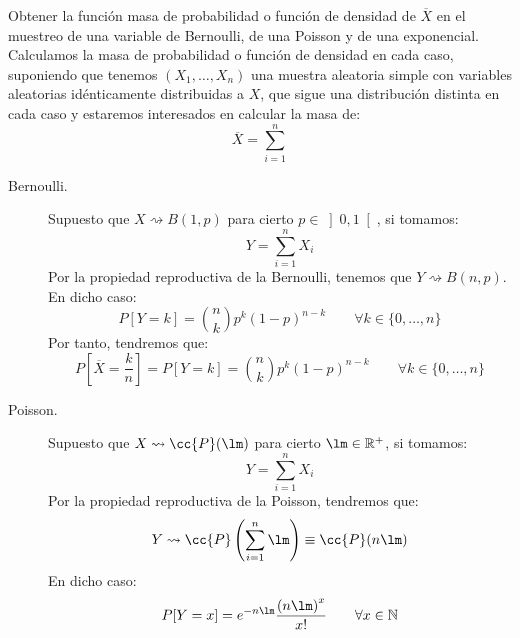 \begin{ejercicio}
    Obtener la función masa de probabilidad o función de densidad de $\overline{X}$ en el muestreo de una variable de Bernoulli, de una Poisson y de una exponencial.\\

    \noindent
    Calculamos la masa de probabilidad o función de densidad en cada caso, suponiendo que tenemos $(X_1, \ldots, X_n)$ una muestra aleatoria simple con variables aleatorias idénticamente distribuidas a $X$, que sigue una distribución distinta en cada caso y estaremos interesados en calcular la masa de:
    \begin{equation*}
        \overline{X} = \sum_{i=1}^{n}
    \end{equation*}
    \begin{description}
        \item [Bernoulli.] Supuesto que $X\rightsquigarrow B(1,p)$ para cierto $p\in \left]0,1\right[$, si tomamos:
            \begin{equation*}
                Y = \sum_{i=1}^{n}X_i
            \end{equation*}
            Por la propiedad reproductiva de la Bernoulli, tenemos que $Y\rightsquigarrow B(n,p)$. En dicho caso:
            \begin{equation*}
                P[Y=k] = \binom{n}{k} p^k {(1-p)}^{n-k} \qquad \forall k\in \{0,\ldots,n\}
            \end{equation*}
            Por tanto, tendremos que:
            \begin{equation*}
                P\left[\overline{X} = \frac{k}{n}\right] = P[Y=k] = \binom{n}{k} p^k {(1-p)}^{n-k} \qquad \forall k\in \{0,\ldots,n\}
            \end{equation*}
        \item [Poisson.] Supuesto que $X\rightsquigarrow \cc{P}(\lm)$ para cierto $\lm\in \mathbb{R}^+$, si tomamos:
            \begin{equation*}
                Y = \sum_{i=1}^{n}X_i
            \end{equation*}
            Por la propiedad reproductiva de la Poisson, tendremos que:
            \begin{equation*}
                Y\rightsquigarrow\cc{P}\left(\sum_{i=1}^{n}\lm\right) \equiv \cc{P}(n\lm)
            \end{equation*}
            En dicho caso:
            \begin{equation*}
                P[Y=x] = e^{-n\lm} \dfrac{{(n\lm)}^{x}}{x!} \qquad \forall x\in \mathbb{N}

\end{equation*}
\end{description}
\end{ejercicio}

